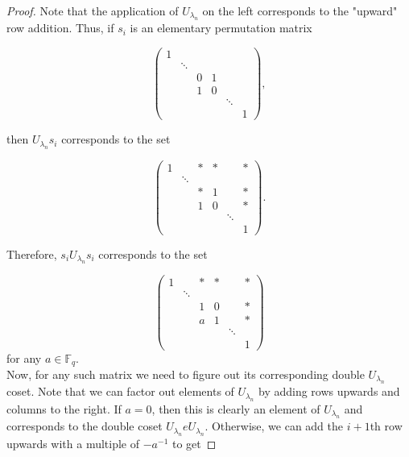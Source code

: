 \documentclass[12pt,reqno]{amsart}
\theoremstyle{definition}
\theoremstyle{remark}
\numberwithin{equation}{section}
\begin{document}
\begin{proof}


Note that the application of $U_{\lambda_n}$ on the left corresponds to the "upward" row addition. Thus, if $s_i$ is an elementary permutation matrix

\[\begin{pmatrix}
1 &  &  &  &  &  \\
 & \ddots &  &  &  &  \\
 &  & 0 & 1 &  &  \\
 &  & 1 & 0 &  &  \\
 &  &  &  & \ddots &  \\
 &  &  &  &  & 1 
\end{pmatrix},\]

then $U_{\lambda_n} s_i$ corresponds to the set

\[\begin{pmatrix}
1 &  & * & * &  & * \\
 & \ddots &  &  &  &  \\
 &  & * & 1 &  & * \\
 &  & 1 & 0 &  & * \\
 &  &  &  & \ddots &  \\
 &  &  &  &  & 1 
\end{pmatrix}.\]

Therefore, $s_i U_{\lambda_n} s_i$ corresponds to the set

\[\begin{pmatrix}
1 &  & * & * &  & * \\
 & \ddots &  &  &  &  \\
 &  & 1 & 0 &  & * \\
 &  & a & 1 &  & * \\
 &  &  &  & \ddots &  \\
 &  &  &  &  & 1 
\end{pmatrix}\]
for any $a\in \mathbb{F}_q$.\\

Now, for any such matrix we need to figure out its corresponding double $U_{\lambda_n}$ coset. Note that we can factor out elements of $U_{\lambda_n}$ by adding rows upwards and columns to the right. If $a = 0$, then this is clearly an element of $U_{\lambda_n}$ and corresponds to the double coset $U_{\lambda_n} eU_{\lambda_n}$. Otherwise, we can add the $i+1$th row upwards with a multiple of $-a^{-1}$ to get


\end{proof}
\end{document}
